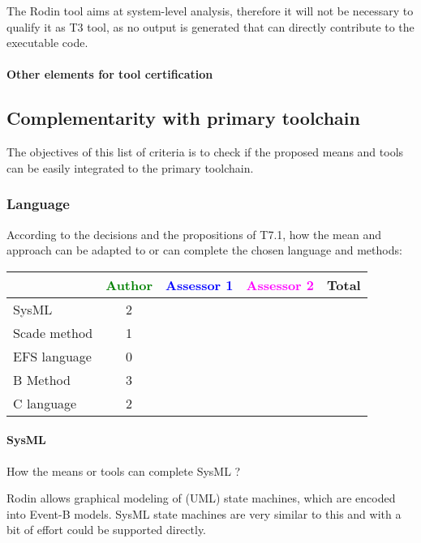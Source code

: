 \begin{author_comment}
  The Rodin tool aims at system-level analysis, therefore it will not be
  necessary to qualify it as T3 tool, as no output is generated that can
  directly contribute to the executable code.
\end{author_comment}


\paragraph{Other elements for tool certification}


\subsection{Complementarity with primary toolchain}

The objectives of this list of criteria is to check if the proposed means and tools can be easily integrated to the primary toolchain.

\subsubsection{Language}


According to the decisions and the propositions of T7.1, how the mean and approach can be adapted to or can complete the chosen language and methods:

\begin{tabular}{|l | c | c | c | c|}
\hline
& \textcolor{green}{Author} & \textcolor{blue}{Assessor 1} & \textcolor{magenta}{Assessor 2} & Total \\
\hline
SysML  & 2 & & & \\
\hline
Scade method & 1 & & & \\
\hline
EFS language & 0 & & & \\
\hline
B Method & 3 & & & \\
\hline
C language & 2 & & & \\
\hline
\end{tabular}

\paragraph{SysML}
How the means or tools can complete SysML ?

\begin{author_comment}
  Rodin allows graphical modeling of (UML) state machines, which are encoded
  into Event-B models. SysML state machines are very similar to this and with a
  bit of effort could be supported directly.
\end{author_comment}


